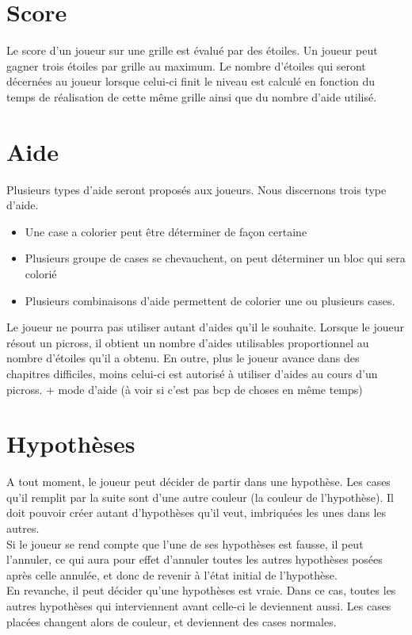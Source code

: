 \documentclass{report}
\begin{document}
		
		\section{Score}
			Le score d'un joueur sur une grille est évalué par des étoiles. Un joueur peut gagner trois étoiles par grille au maximum. Le nombre d'étoiles qui seront décernées au joueur lorsque celui-ci finit le niveau est calculé en fonction du temps de réalisation de cette même grille ainsi que du nombre d'aide utilisé.
			
		\section{Aide}
			Plusieurs types d'aide seront proposés aux joueurs. Nous discernons trois type d'aide.
			\begin{itemize}
			    \item Une case a colorier peut être déterminer de façon certaine
			    \item Plusieurs groupe de cases se chevauchent, on peut déterminer un bloc qui sera colorié
			    \item Plusieurs combinaisons d'aide permettent de colorier une ou plusieurs cases.
			\end{itemize}
			Le joueur ne pourra pas utiliser autant d'aides qu'il le souhaite. Lorsque le joueur résout un picross, il obtient un nombre d'aides utilisables proportionnel au nombre d'étoiles qu'il a obtenu. En outre, plus le joueur avance dans des chapitres difficiles, moins celui-ci est autorisé à utiliser d'aides au cours d'un picross. + mode d'aide (à voir si c'est pas bcp de choses en même temps)

		\section{Hypothèses}			
			A tout moment, le joueur peut décider de partir dans une hypothèse. Les cases qu'il remplit par la suite sont d'une autre couleur (la couleur de l'hypothèse). Il doit pouvoir créer autant d'hypothèses qu'il veut, imbriquées les unes dans les autres.\\
			Si le joueur se rend compte que l'une de ses hypothèses est fausse, il peut l'annuler, ce qui aura pour effet d'annuler toutes les autres hypothèses posées après celle annulée, et donc de revenir à l'état initial de l'hypothèse.\\
			En revanche, il peut décider qu'une hypothèses est vraie. Dans ce cas, toutes les autres hypothèses qui interviennent avant celle-ci le deviennent aussi. Les cases placées changent alors de couleur, et deviennent des cases normales.
		
\end{document}
